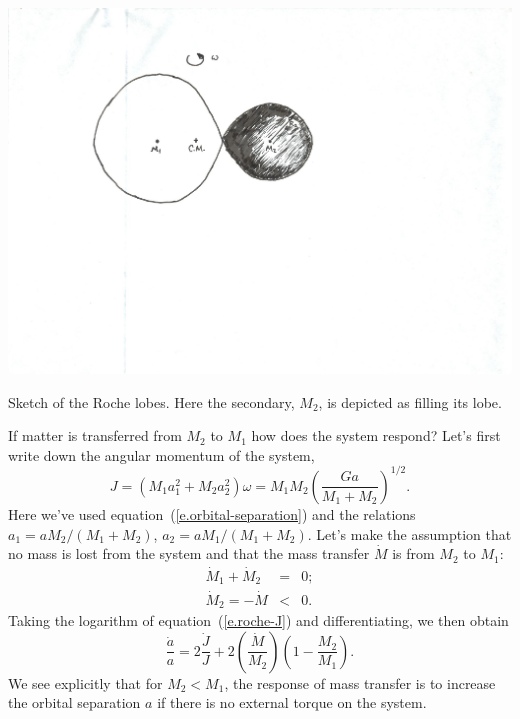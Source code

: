 \begin{marginfigure}
\includegraphics[width=\linewidth]{Figures/roche-sketch}
\caption[Schematic of Roche lobes]{\label{f.roche} Sketch of the Roche lobes. Here the secondary, $M_{2}$, is depicted as filling its lobe.}
\end{marginfigure}

If matter is transferred from $M_{2}$ to $M_{1}$ how does the system respond?  Let's first write down the angular momentum of the system,
\begin{equation}\label{e.roche-J}
J = (M_{1}a_{1}^{2} + M_{2}a_{2}^{2}) \omega = M_{1}M_{2}\left(\frac{Ga}{M_{1}+M_{2}}\right)^{1/2}.
\end{equation}
Here we've used equation~(\ref{e.orbital-separation}) and the relations $a_{1} = aM_{2}/(M_{1}+M_{2})$, $a_{2} = aM_{1}/(M_{1}+M_{2})$.  Let's make the assumption that no mass is lost from the system and that the mass transfer $\dot{M}$ is from $M_{2}$ to $M_{1}$:
\begin{eqnarray*}
\dot{M}_{1} + \dot{M}_{2} &=& 0;\\
\dot{M}_{2} = -\dot{M} &<& 0.
\end{eqnarray*}
Taking the logarithm of equation~(\ref{e.roche-J}) and differentiating, we then obtain
\begin{equation}\label{e.roche-adot}
\frac{\dot{a}}{a} = 2\frac{\dot{J}}{J}  + 2 \left(\frac{\dot{M}}{M_{2}}\right) \left(1-\frac{M_{2}}{M_{1}}\right).
\end{equation}
We see explicitly that for $M_{2}< M_{1}$, the response of mass transfer is to increase the orbital separation $a$ if there is no external torque on the system.

